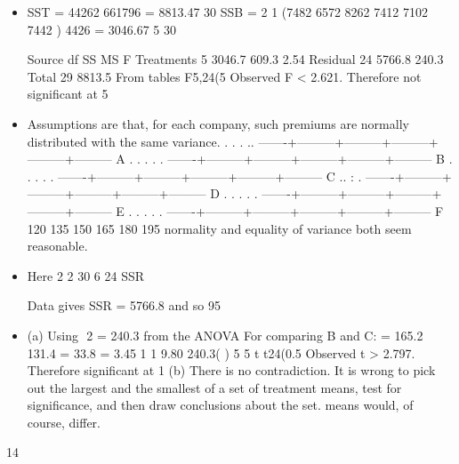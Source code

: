 \documentclass[a4paper,12pt]{article}
\begin{document}
\begin{enumerate}
\begin{itemize}
\item SST =
44262 661796 = 8813.47
30 
SSB =
2
1 (7482 6572 8262 7412 7102 7442 ) 4426 = 3046.67
5 30

Source df SS MS F
Treatments 5 3046.7 609.3 2.54
Residual 24 5766.8 240.3
Total 29 8813.5
From tables F5,24(5%
Observed F < 2.621. Therefore not significant at 5%
\item Assumptions are that, for each company, such premiums are normally
distributed with the same variance.
              .   .           .         ..
  -------+---------+---------+---------+---------+---------
A
      .  .     .       .      .
  -------+---------+---------+---------+---------+---------
B
                            .   .    .        .      .
  -------+---------+---------+---------+---------+---------
C
                    ..      :             .
  -------+---------+---------+---------+---------+---------
D
           .     .      .     .     .
  -------+---------+---------+---------+---------+---------
E
                .      .  .     .           .
  -------+---------+---------+---------+---------+---------
F
       120       135       150       165       180       195
normality and equality of variance both seem reasonable.
\item Here 2
2 30 6 24 SSR ~


% 
Data gives SSR = 5766.8
and so 95%
\item (a) Using  2 = 240.3 from the ANOVA
For comparing B and C: = 165.2 131.4 = 33.8 = 3.45
1 1 9.80 240.3( )
5 5
t 
t24(0.5%
Observed t > 2.797. Therefore significant at 1%
(b) There is no contradiction.
It is wrong to pick out the largest and the smallest of a set of treatment
means, test for significance, and then draw conclusions about the set.
means would, of course, differ.
\end{itemize}
14 


\end{enumerate}
\end{document}
